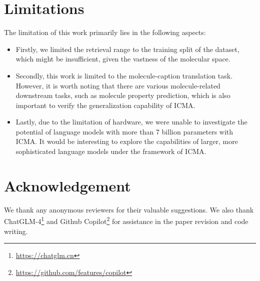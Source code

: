 \section{Limitations}
The limitation of this work primarily lies in the following aspects:
\begin{itemize}
    \item Firstly, we limited the retrieval range to the training split of the dataset, which might be insufficient, given the vastness of the molecular space. 
    \item Secondly, this work is limited to the molecule-caption translation task. However, it is worth noting that there are various molecule-related downstream tasks, such as molecule property prediction, which is also important to verify the generalization capability of ICMA.
    \item Lastly, due to the limitation of hardware, we were unable to investigate the potential of language models with more than 7 billion parameters with ICMA. It would be interesting to explore the capabilities of larger, more sophisticated language models under the framework of ICMA.
\end{itemize}

\section{Acknowledgement}
We thank any anonymous reviewers for their valuable suggestions. We also thank ChatGLM-4\footnote{\url{https://chatglm.cn}} and Github Copilot\footnote{\url{https://github.com/features/copilot}} for assistance in the paper revision and code writing.

